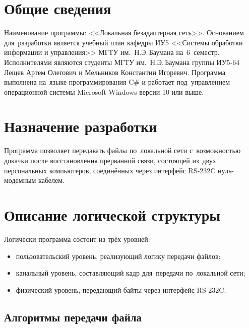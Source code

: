 \documentclass[a4paper,12pt]{article}
\begin{document}
\section{Общие сведения}
Наименование программы: <<Локальная безадаптерная сеть>>. Основанием для~разработки является учебный план кафедры ИУ5 <<Системы обработки информации и управления>> МГТУ им.~Н.Э.\,Баумана на~6~семестр. Исполнителями являются студенты МГТУ им.~Н.Э.\,Баумана группы ИУ5-64 Лещев Артем Олегович и Мельников Константин Игоревич. Программа выполнена на~языке программирования C\# и работает под~управлением операционной системы Microsoft Windows версии 10 или выше.

\section{Назначение разработки}
Программа позволяет передавать файлы по~локальной сети с~возможностью докачки после восстановления прерванной связи, состоящей из~двух персональных компьютеров, соединённых через интерфейс RS-232C нуль-модемным кабелем.

\section{Описание логической структуры}
Логически программа состоит из трёх уровней:
\begin{itemize}
\item пользовательский уровень, реализующий логику передачи файлов;
\item канальный уровень, составляющий кадр для~передачи по~локальной сети;
\item физический уровень, передающий байты через интерфейс RS-232C.
\end{itemize}
\subsection{Алгоритмы передачи файла}
\end{document}
